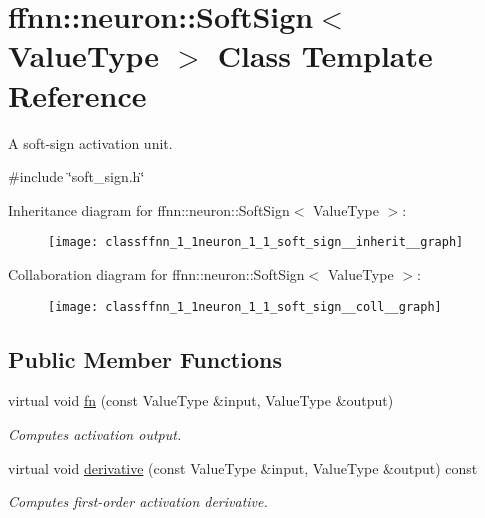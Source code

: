 \hypertarget{classffnn_1_1neuron_1_1_soft_sign}{\section{ffnn\-:\-:neuron\-:\-:Soft\-Sign$<$ Value\-Type $>$ Class Template Reference}
\label{classffnn_1_1neuron_1_1_soft_sign}
}


A soft-\/sign activation unit.  




{\ttfamily \#include \char`\"{}soft\-\_\-sign.\-h\char`\"{}}



Inheritance diagram for ffnn\-:\-:neuron\-:\-:Soft\-Sign$<$ Value\-Type $>$\-:\nopagebreak
\begin{figure}[H]
\begin{center}
\leavevmode
\texttt{[image: classffnn\_1\_1neuron\_1\_1\_soft\_sign\_\_inherit\_\_graph]}
\end{center}
\end{figure}


Collaboration diagram for ffnn\-:\-:neuron\-:\-:Soft\-Sign$<$ Value\-Type $>$\-:\nopagebreak
\begin{figure}[H]
\begin{center}
\leavevmode
\texttt{[image: classffnn\_1\_1neuron\_1\_1\_soft\_sign\_\_coll\_\_graph]}
\end{center}
\end{figure}
\subsection*{Public Member Functions}
\begin{DoxyCompactItemize}
\item 
virtual void \hyperlink{classffnn_1_1neuron_1_1_soft_sign_ac6e67e51f8879c44940ef0c419911259}{fn} (const Value\-Type \&input, Value\-Type \&output)
\begin{DoxyCompactList}\small\item\em Computes activation output. \end{DoxyCompactList}\item 
virtual void \hyperlink{classffnn_1_1neuron_1_1_soft_sign_a1284d2661377557e782547613e299736}{derivative} (const Value\-Type \&input, Value\-Type \&output) const 
\begin{DoxyCompactList}\small\item\em Computes first-\/order activation derivative. \end{DoxyCompactList}\end{DoxyCompactItemize}


